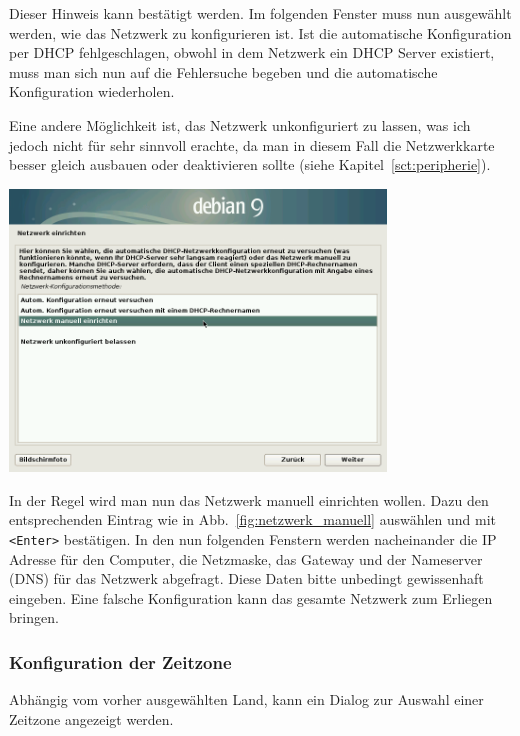 \documentclass[a4paper,12pt,twoside]{article}
\begin{document}
Dieser Hinweis kann bestätigt werden. Im folgenden Fenster muss nun
ausgewählt werden, wie das Netzwerk zu konfigurieren ist. Ist die
automatische Konfiguration per DHCP fehlgeschlagen, obwohl in dem
Netzwerk ein DHCP Server existiert, muss man sich nun auf die
Fehlersuche begeben und die automatische Konfiguration wiederholen.

Eine andere Möglichkeit ist, das Netzwerk unkonfiguriert zu lassen, was
ich jedoch nicht für sehr sinnvoll erachte, da man in diesem Fall die
Netzwerkkarte besser gleich ausbauen oder deaktivieren sollte (siehe
Kapitel~\ref{sct:peripherie}).

\bigskip
\begin{minipage}{\textwidth}
    \centering
    \captionsetup{type=figure}
    \includegraphics[width=10cm]{screenshots/select_network_manually.png}
    \label{fig:netzwerk_manuell}
\end{minipage}
\bigskip

In der Regel wird man nun das Netzwerk manuell einrichten wollen. Dazu
den entsprechenden Eintrag wie in Abb.~\ref{fig:netzwerk_manuell} auswählen und
mit \texttt{{\textless}Enter{\textgreater}} bestätigen. In den nun folgenden
Fenstern werden nacheinander die IP Adresse für den Computer, die
Netzmaske, das Gateway und der Nameserver (DNS) für das Netzwerk
abgefragt. Diese Daten bitte unbedingt gewissenhaft eingeben. Eine
falsche Konfiguration kann das gesamte Netzwerk zum Erliegen bringen.


\subsubsection{Konfiguration der Zeitzone}
\label{sct:inst_timezone}

Abhängig vom vorher ausgewählten Land, kann ein Dialog zur Auswahl einer
Zeitzone angezeigt werden.
\end{document}
